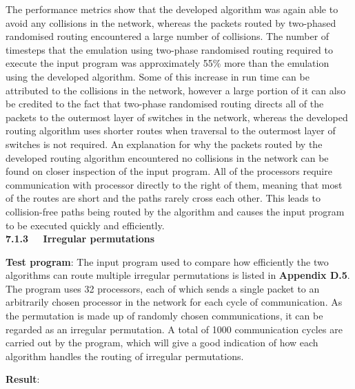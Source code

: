 \documentclass[a4paper, 12pt]{article}
\begin{document}
The performance metrics show that the developed algorithm was again able to avoid any collisions in the network, whereas the packets routed by two-phased randomised routing encountered a large number of collisions. The number of timesteps that the emulation using two-phase randomised routing required to execute the input program was approximately 55\% more than the emulation using the developed algorithm. Some of this increase in run time can be attributed to the collisions in the network, however a large portion of it can also be credited to the fact that two-phase randomised routing directs all of the packets to the outermost layer of switches in the network, whereas the developed routing algorithm uses shorter routes when traversal to the outermost layer of switches is not required. An explanation for why the packets routed by the developed routing algorithm encountered no collisions in the network can be found on closer inspection of the input program. All of the processors require communication with processor directly to the right of them, meaning that most of the routes are short and the paths rarely cross each other. This leads to collision-free paths being routed by the algorithm and causes the input program to be executed quickly and efficiently.\\

\noindent\textbf{7.1.3 \ \ Irregular permutations}

\noindent\textbf{Test program}: The input program used to compare how efficiently the two algorithms can route multiple irregular permutations is listed in \textbf{Appendix D.5}. The program uses 32 processors, each of which sends a single packet to an arbitrarily chosen processor in the network for each cycle of communication. As the permutation is made up of randomly chosen communications, it can be regarded as an irregular permutation. A total of 1000 communication cycles are carried out by the program, which will give a good indication of how each algorithm handles the routing of irregular permutations.

\noindent\textbf{Result}:
\end{document}
